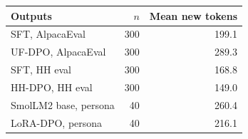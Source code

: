 \begin{tabular}{l r r}
\toprule
Outputs & $n$ & Mean new tokens \\
\midrule
SFT, AlpacaEval & 300 & 199.1 \\
UF-DPO, AlpacaEval & 300 & 289.3 \\
SFT, HH eval & 300 & 168.8 \\
HH-DPO, HH eval & 300 & 149.0 \\
SmolLM2 base, persona & 40 & 260.4 \\
LoRA-DPO, persona & 40 & 216.1 \\
\bottomrule
\end{tabular}

